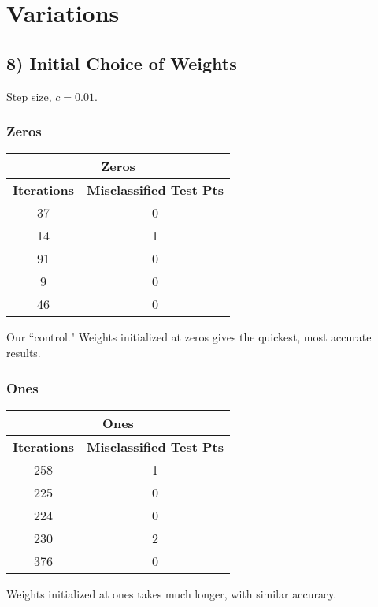 \documentclass{article}
\begin{document}
\newpage
\section*{Variations}
\subsection*{8) Initial Choice of Weights}
Step size, $c = 0.01$.

\subsubsection*{Zeros}
\begin{center}
\begin{tabular}{|c|c|}
	\hline
	\multicolumn{2}{|c|}{\textbf{Zeros}} \\\hline
	\textbf{Iterations} & \textbf{Misclassified Test Pts} \\\hline
	37 & 0 \\
	14 & 1\\
	91 & 0 \\
	9 & 0\\
	46 & 0\\
	\hline
\end{tabular}
\end{center}
Our ``control." Weights initialized at zeros gives the quickest, most accurate results. \\

\subsubsection*{Ones}
\begin{center}
\begin{tabular}{|c|c|}
	\hline
	\multicolumn{2}{|c|}{\textbf{Ones}} \\\hline
	\textbf{Iterations} & \textbf{Misclassified Test Pts} \\\hline
	258 & 1 \\
	225 & 0\\
	224 & 0 \\
	230 & 2\\
	376 & 0\\
	\hline
\end{tabular}
\end{center}
Weights initialized at ones takes much longer, with similar accuracy. \\
\end{document}
